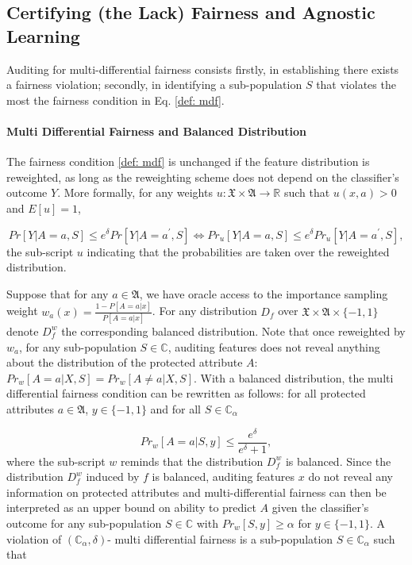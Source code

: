 \documentclass{article}
\begin{document}
\subsection{Certifying (the Lack) Fairness and Agnostic Learning}
Auditing for multi-differential fairness consists firstly, in establishing there exists a fairness violation; secondly, in identifying a sub-population $S$ that violates the most the fairness condition in Eq. \ref{def: mdf}. 

\paragraph{Multi Differential Fairness and Balanced Distribution}
The fairness condition \ref{def: mdf} is unchanged if the feature distribution is reweighted, as long as the reweighting scheme does not depend on the classifier's outcome $Y$. More formally, for any weights $u: \mathfrak{X}\times \mathfrak{A} \rightarrow \mathbb{R}$ such that $u(x,a)> 0$ and $E[u]=1$, 

\begin{equation}
Pr[Y|A=a, S] \leq e^{\delta} Pr[Y|A=a^{'}, S] \iff Pr_{u}[Y|A=a, S] \leq e^{\delta} Pr_{u}[Y|A=a^{'}, S],
\end{equation}
the sub-script $u$ indicating that the probabilities are taken over the reweighted distribution. 

\bigskip
Suppose that for any $a \in \mathfrak{A}$, we have oracle access to the importance sampling weight $w_{a}(x)=\frac{1 - P[A=a|x]}{P[A=a|x]}$. For any distribution $D_{f}$ over $\mathfrak{X} \times \mathfrak{A}\times \{-1, 1\}$ denote $D_{f}^{w}$ the corresponding balanced distribution. Note that once reweighted by $w_{a}$, for any sub-population $S\in \mathbb{C}$, auditing features does not reveal anything about the distribution of the protected attribute $A$: $Pr_{w}[A=a|X, S]=Pr_{w}[A\neq a|X, S]$. With a balanced distribution, the multi differential fairness condition can be rewritten as follows: for all protected attributes $a\in \mathfrak{A}$, $y\in \{-1,1\}$ and for all $S\in \mathbb{C}_{\alpha}$

\begin{equation}
    \label{eq: mdf_w}
    Pr_{w}[A=a |S, y] \leq \frac{e^{\delta}}{e^{\delta} + 1},
\end{equation}
where the sub-script $w$ reminds that the distribution $D_{f}^{w}$ is balanced. Since the distribution $D_{f}^{w}$ induced by $f$ is balanced, auditing features $x$ do not reveal any information on protected attributes and multi-differential fairness can then be interpreted as an upper bound on ability to predict $A$ given the classifier's outcome for any sub-population $S\in \mathbb{C}$ with $Pr_{w}[S, y] \geq \alpha$ for $y\in\{-1, 1\}$.  A violation of $(\mathbb{C}_{\alpha}, \delta)$- multi differential fairness is a sub-population $S\in \mathbb{C}_{\alpha}$ such that 
\end{document}
